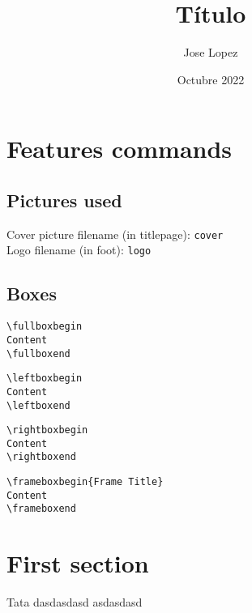 \documentclass[12pt]{article}
\title{Título}
\author{Jose Lopez \newline \urc}
\date{Octubre 2022}
\begin{document}
\maketitle

\tableofcontents
\clearpage

\section{Features commands}

\subsection{Pictures used}

Cover picture filename (in titlepage): \texttt{cover}\\
Logo filename (in foot): \texttt{logo}

\subsection{Boxes}

\begin{verbatim}
\fullboxbegin
Content
\fullboxend
\end{verbatim}

\begin{verbatim}
\leftboxbegin
Content
\leftboxend
\end{verbatim}

\begin{verbatim}
\rightboxbegin
Content
\rightboxend
\end{verbatim}

\begin{verbatim}
\frameboxbegin{Frame Title}
Content
\frameboxend
\end{verbatim}

\newpage

\section{First section} \label{seccion-1}
\lipsum[1]

\fullboxbegin
\lipsum[1]
\fullboxend

\fullboxbegin
Tata dasdasdasd asdasdasd
\fullboxend

\lipsum[1]
\end{document}
